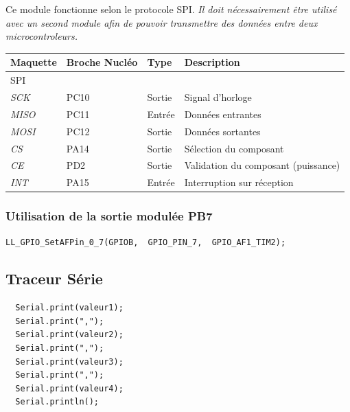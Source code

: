\documentclass[a4paper,11pt,titlepage]{article} %
\begin{document}
Ce module fonctionne selon le protocole SPI. \textit{Il doit nécessairement être utilisé avec un second module afin de pouvoir transmettre des données entre deux microcontroleurs.}

\begin{center}
\begin{tabular}{|l|l|l|l|}
\hline 
Maquette & \textbf{Broche Nucléo} & Type & Description \\ 
\hline 
\textsc{SPI} & & & \\ 
\textit{SCK} & PC10 & Sortie & Signal d'horloge\\
\textit{MISO} & PC11 & Entrée & Données entrantes\\
\textit{MOSI} & PC12 & Sortie & Données sortantes\\ 
\hline  
\textit{CS} & PA14 & Sortie & Sélection du composant\\ 
\textit{CE} & PD2 & Sortie & Validation du composant (puissance)\\ 
\textit{INT} & PA15 & Entrée & Interruption sur réception\\ 
\hline  
\end{tabular} 
\end{center}


\subsubsection{Utilisation de la sortie modulée PB7}
	
\begin{lstlisting}
LL_GPIO_SetAFPin_0_7(GPIOB,  GPIO_PIN_7,  GPIO_AF1_TIM2);
\end{lstlisting}


\subsection{Traceur Série}

\begin{lstlisting}
  Serial.print(valeur1);
  Serial.print(",");
  Serial.print(valeur2);
  Serial.print(",");
  Serial.print(valeur3);
  Serial.print(",");
  Serial.print(valeur4);
  Serial.println();
\end{lstlisting}


\end{document}
